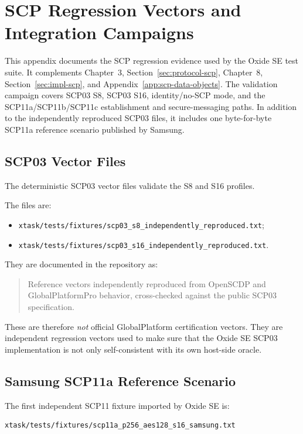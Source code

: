 \chapter{SCP Regression Vectors and Integration Campaigns}
\label{app:scp03-vectors}

This appendix documents the SCP regression evidence used by the Oxide SE test
suite. It complements Chapter~3, Section~\ref{sec:protocol-scp}, Chapter~8,
Section~\ref{sec:impl-scp}, and Appendix~\ref{app:scp-data-objects}. The
validation campaign covers SCP03 S8, SCP03 S16, identity/no-SCP mode, and the
SCP11a/SCP11b/SCP11c establishment and secure-messaging paths. In addition to
the independently reproduced SCP03 files, it includes one byte-for-byte
SCP11a reference scenario published by Samsung.

\section{SCP03 Vector Files}

The deterministic SCP03 vector files validate the S8 and S16 profiles.

The files are:
\begin{itemize}
\item \texttt{xtask/tests/fixtures/scp03\_s8\_independently\_reproduced.txt};
\item \texttt{xtask/tests/fixtures/scp03\_s16\_independently\_reproduced.txt}.
\end{itemize}

They are documented in the repository as:

\begin{quote}
Reference vectors independently reproduced from OpenSCDP and GlobalPlatformPro
behavior, cross-checked against the public SCP03 specification.
\end{quote}

These are therefore \emph{not} official GlobalPlatform certification vectors.
They are independent regression vectors used to make sure that the Oxide SE
SCP03 implementation is not only self-consistent with its own host-side oracle.

\section{Samsung SCP11a Reference Scenario}

The first independent SCP11 fixture imported by Oxide SE is:

\begin{verbatim}
xtask/tests/fixtures/scp11a_p256_aes128_s16_samsung.txt
\end{verbatim}

